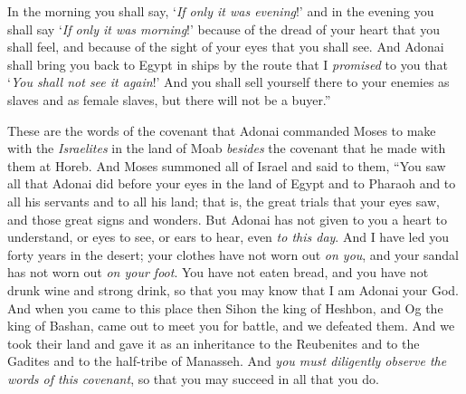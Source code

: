 \begin{biblechapter}
\verse In the morning you shall say, ‘\textit{If only it was evening}!’ and in the evening you shall say ‘\textit{If only it was morning}!’ because of the dread of your heart that you shall feel, and because of the sight of your eyes that you shall see.
\verse And Adonai shall bring you back to Egypt in ships by the route that I \textit{promised} to you that ‘\textit{You shall not see it again}!’ And you shall sell yourself there to your enemies as slaves and as female slaves, but there will not be a buyer.”
\end{biblechapter}

\begin{biblechapter} %
  These are the words of the covenant that Adonai commanded Moses to make with the \textit{Israelites} in the land of Moab \textit{besides} the covenant that he made with them at Horeb.
\verse And Moses summoned all of Israel and said to them, “You saw all that Adonai did before your eyes in the land of Egypt and to Pharaoh and to all his servants and to all his land;
\verse that is, the great trials that your eyes saw, and those great signs and wonders.
\verse But Adonai has not given to you a heart to understand, or eyes to see, or ears to hear, even \textit{to this day}.
\verse And I have led you forty years in the desert; your clothes have not worn out \textit{on you}, and your sandal has not worn out \textit{on your foot}.
\verse You have not eaten bread, and you have not drunk wine and strong drink, so that you may know that I am Adonai your God.
\verse And when you came to this place then Sihon the king of Heshbon, and Og the king of Bashan, came out to meet you for battle, and we defeated them.
\verse And we took their land and gave it as an inheritance to the Reubenites and to the Gadites and to the half-tribe of Manasseh.
\verse And \textit{you must diligently observe the words of this covenant}, so that you may succeed in all that you do.

\end{biblechapter}
